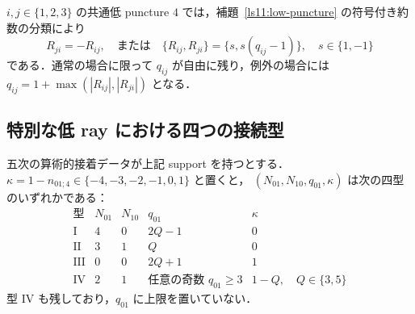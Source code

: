 $i,j\in\{1,2,3\}$ の共通低 puncture $4$ では，補題~\ref{ls11:low-puncture} の符号付き約数の分類により
\begin{equation}\label{lh18:reverse-partners}
 R_{ji}=-R_{ij},\quad\text{または}\quad
 \{R_{ij},R_{ji}\}=\{s,s(q_{ij}-1)\},\quad s\in\{1,-1\}
\end{equation}
である．通常の場合に限って $q_{ij}$ が自由に残り，例外の場合には
$q_{ij}=1+\max(|R_{ij}|,|R_{ji}|)$ となる．

\subsection{特別な低 ray における四つの接続型}

\begin{lemma}\label{lh18:B-types}
五次の算術的接着データが上記 support を持つとする．
$\kappa=1-n_{01;4}\in\{-4,-3,-2,-1,0,1\}$ と置くと，
$(N_{01},N_{10},q_{01},\kappa)$ は次の四型のいずれかである：
\begin{equation}\label{lh18:B-table}
\begin{array}{c|cccl}
 \text{型}&N_{01}&N_{10}&q_{01}&\kappa\\\hline
 \mathrm I&4&0&2Q-1&0\\
 \mathrm {II}&3&1&Q&0\\
 \mathrm {III}&0&0&2Q+1&1\\
 \mathrm {IV}&2&1&\text{任意の奇数 }q_{01}\ge3&1-Q,\quad Q\in\{3,5\}
\end{array}
\end{equation}
型 IV も残しており，$q_{01}$ に上限を置いていない．
\end{lemma}

